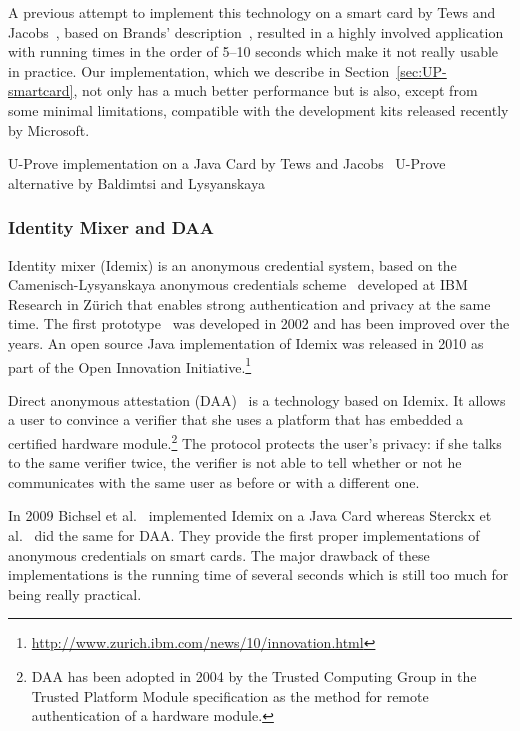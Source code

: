 A previous attempt to implement this technology on a smart card by Tews and
Jacobs~\cite{TewsJacobs09}, based on Brands' description~\cite{Brands2000},
resulted in a highly involved application with running times in the order
of 5--10 seconds which make it not really usable in practice. Our
implementation, which we describe in Section~\ref{sec:UP-smartcard}, not only
has a much better performance but is also, except from some minimal
limitations, compatible with the development kits released recently by
Microsoft.

U-Prove implementation on a Java Card by Tews and Jacobs~\cite{TewsJacobs09}
U-Prove alternative by Baldimtsi and Lysyanskaya~\cite{BaLy2012}

\subsubsection{Identity Mixer and DAA}\label{sec:idemix}

Identity mixer (Idemix) is an anonymous credential system, based on the
Camenisch-Lysyanskaya anonymous credentials
scheme~\cite{CamenischLysyanskaya2001, CamenischLysyanskaya2003,
Lysyanskaya2002} developed at IBM Research in Z\"urich that enables strong
authentication and privacy at the same time. The first
prototype~\cite{CamenischH02} was developed in 2002 and has been improved
over the years. An open source Java implementation of Idemix was released
in 2010 as part of the Open Innovation
Initiative.\footnote{\url{http://www.zurich.ibm.com/news/10/innovation.html}}

Direct anonymous attestation (DAA)~\cite{BrickellCC04} is a technology based
on Idemix. It allows a user to convince a verifier that she uses a platform
that has embedded a certified hardware module.\footnote{DAA has
been adopted in 2004 by the Trusted Computing Group in the Trusted Platform Module
specification as the method for remote authentication of a hardware
module.} The protocol protects the user's privacy: if she talks to the same
verifier twice, the verifier is not able to tell whether or not he
communicates with the same user as before or with a different one.

In 2009 Bichsel et al.~\cite{BichselCGS2009} implemented Idemix on a Java
Card whereas Sterckx et al.~\cite{Sterckx09} did the same for DAA. They
provide the first proper implementations of anonymous credentials on smart
cards. The major drawback of these implementations is the running
time of several seconds which is still too much for being really practical.


